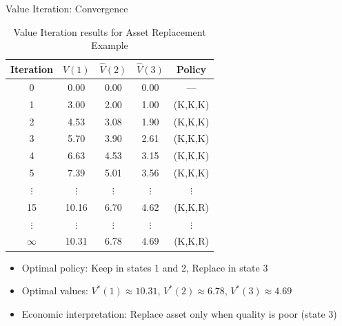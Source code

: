\documentclass[10pt]{beamer}
\begin{document}
\begin{frame}{Value Iteration: Convergence}
    \begin{table}
        \centering \small %
        \begin{tabular}{ccccc}
            \toprule
            Iteration & $\hat{V}(1)$ & $\hat{V}(2)$ & $\hat{V}(3)$ & Policy \\
            \midrule
            0 & 0.00 & 0.00 & 0.00 & --- \\ %
            1 & 3.00 & 2.00 & 1.00 & (K,K,K) \\
            2 & 4.53 & 3.08 & 1.90 & (K,K,K) \\ %
            3 & 5.70 & 3.90 & 2.61 & (K,K,K) \\
            4 & 6.63 & 4.53 & 3.15 & (K,K,K) \\
            5 & 7.39 & 5.01 & 3.56 & (K,K,K) \\
            $\vdots$ & $\vdots$ & $\vdots$ & $\vdots$ & $\vdots$ \\
            15 & 10.16 & 6.70 & 4.62 & (K,K,R) \\
            $\vdots$ & $\vdots$ & $\vdots$ & $\vdots$ & $\vdots$ \\
            $\infty$ & 10.31 & 6.78 & 4.69 & (K,K,R) \\ %
            \bottomrule
        \end{tabular}
        \caption{Value Iteration results for Asset Replacement Example}
    \end{table}

    \begin{itemize}
        \item Optimal policy: Keep in states 1 and 2, Replace in state 3
        \item Optimal values: $V^*(1) \approx 10.31$, $V^*(2) \approx 6.78$, $V^*(3) \approx 4.69$
        \item Economic interpretation: Replace asset only when quality is poor (state 3)
    \end{itemize}
\end{frame}

\end{document}
